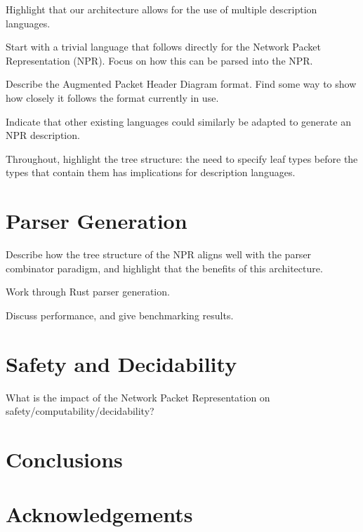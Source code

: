 \documentclass[10pt,twocolumn,a4paper]{article}
\begin{document}
Highlight that our architecture allows for the use of multiple description
languages.

Start with a trivial language that follows directly for the Network Packet
Representation (NPR). Focus on how this can be parsed into the NPR.

Describe the Augmented Packet Header Diagram format. Find some way to show how
closely it follows the format currently in use.

Indicate that other existing languages could similarly be adapted to generate
an NPR description.

Throughout, highlight the tree structure: the need to specify leaf types before
the types that contain them has implications for description languages.

\section{Parser Generation}

Describe how the tree structure of the NPR aligns well with the parser
combinator paradigm, and highlight that the benefits of this architecture.

Work through Rust parser generation.

Discuss performance, and give benchmarking results.

\section{Safety and Decidability}

What is the impact of the Network Packet Representation on
safety/computability/decidability?

\section{Conclusions}

\section{Acknowledgements}
\end{document}
